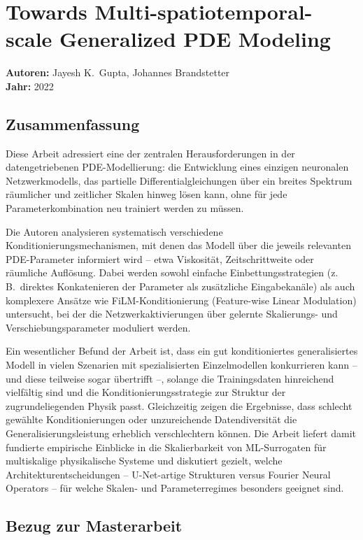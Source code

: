 \documentclass[a4paper,12pt]{article}
\begin{document}
\section*{Towards Multi-spatiotemporal-scale Generalized PDE Modeling}
\textbf{Autoren:} Jayesh K.\ Gupta, Johannes Brandstetter \\
\textbf{Jahr:} 2022

\subsection*{Zusammenfassung}

Diese Arbeit adressiert eine der zentralen Herausforderungen in der datengetriebenen PDE-Modellierung: die Entwicklung eines einzigen neuronalen Netzwerkmodells, das partielle Differentialgleichungen über ein breites Spektrum räumlicher und zeitlicher Skalen hinweg lösen kann, ohne für jede Parameterkombination neu trainiert werden zu müssen.

Die Autoren analysieren systematisch verschiedene Konditionierungsmechanismen, mit denen das Modell über die jeweils relevanten PDE-Parameter informiert wird -- etwa Viskosität, Zeitschrittweite oder räumliche Auflösung. Dabei werden sowohl einfache Einbettungsstrategien (z.\,B.\ direktes Konkatenieren der Parameter als zusätzliche Eingabekanäle) als auch komplexere Ansätze wie FiLM-Konditionierung (Feature-wise Linear Modulation) untersucht, bei der die Netzwerkaktivierungen über gelernte Skalierungs- und Verschiebungsparameter moduliert werden.

Ein wesentlicher Befund der Arbeit ist, dass ein gut konditioniertes generalisiertes Modell in vielen Szenarien mit spezialisierten Einzelmodellen konkurrieren kann -- und diese teilweise sogar übertrifft --, solange die Trainingsdaten hinreichend vielfältig sind und die Konditionierungsstrategie zur Struktur der zugrundeliegenden Physik passt. Gleichzeitig zeigen die Ergebnisse, dass schlecht gewählte Konditionierungen oder unzureichende Datendiversität die Generalisierungsleistung erheblich verschlechtern können. Die Arbeit liefert damit fundierte empirische Einblicke in die Skalierbarkeit von ML-Surrogaten für multiskalige physikalische Systeme und diskutiert gezielt, welche Architekturentscheidungen -- U-Net-artige Strukturen versus Fourier Neural Operators -- für welche Skalen- und Parameterregimes besonders geeignet sind.

\subsection*{Bezug zur Masterarbeit}
\end{document}

